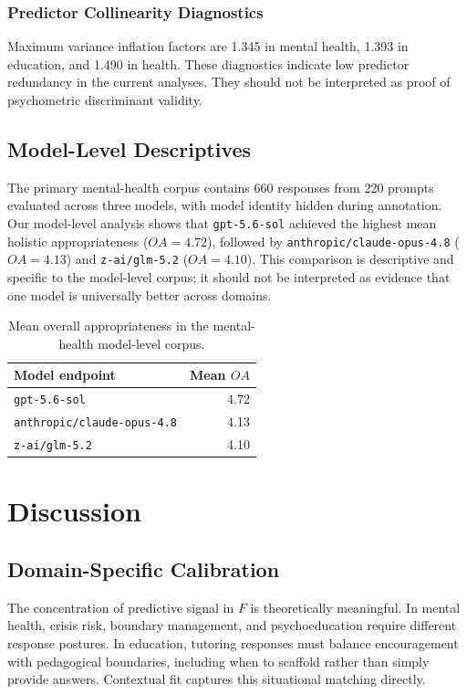 \documentclass[manuscript,review,anonymous]{acmart}
\begin{document}
\subsubsection{Predictor Collinearity Diagnostics}

Maximum variance inflation factors are 1.345 in mental health, 1.393 in education, and 1.490 in health. These diagnostics indicate low predictor redundancy in the current analyses. They should not be interpreted as proof of psychometric discriminant validity.

\subsection{Model-Level Descriptives}

The primary mental-health corpus contains 660 responses from 220 prompts evaluated across three models, with model identity hidden during annotation. Our model-level analysis shows that \texttt{gpt-5.6-sol} achieved the highest mean holistic appropriateness ($OA=4.72$), followed by \texttt{anthropic/claude-opus-4.8} ($OA=4.13$) and \texttt{z-ai/glm-5.2} ($OA=4.10$). This comparison is descriptive and specific to the model-level corpus; it should not be interpreted as evidence that one model is universally better across domains.

\begin{table}[t]
\centering
\small
\caption{Mean overall appropriateness in the mental-health model-level corpus.}
\label{tab:model-oa}
\begin{tabular}{lr}
\toprule
Model endpoint & Mean $OA$ \\
\midrule
\texttt{gpt-5.6-sol} & 4.72 \\
\texttt{anthropic/claude-opus-4.8} & 4.13 \\
\texttt{z-ai/glm-5.2} & 4.10 \\
\bottomrule
\end{tabular}
\end{table}

\section{Discussion}

\subsection{Domain-Specific Calibration}

The concentration of predictive signal in $F$ is theoretically meaningful. In mental health, crisis risk, boundary management, and psychoeducation require different response postures. In education, tutoring responses must balance encouragement with pedagogical boundaries, including when to scaffold rather than simply provide answers. Contextual fit captures this situational matching directly.
\end{document}
